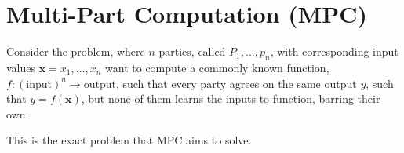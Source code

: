 \section{Multi-Part Computation (MPC)}
\label{sec:background:mpc}
Consider the problem, where $n$ parties, called $P_{1}, \dots, p_{n}$, with
corresponding input values $\textbf{x} = x_{1}, \dots, x_{n}$ want to compute a commonly
known function, $f : (\text{input})^{n} \rightarrow \text{output}$, such that
every party agrees on the same output $y$, such that $y = f(\textbf{x})$, but none of them learns the inputs to function, barring their own.


This is the exact problem that MPC aims to solve.

